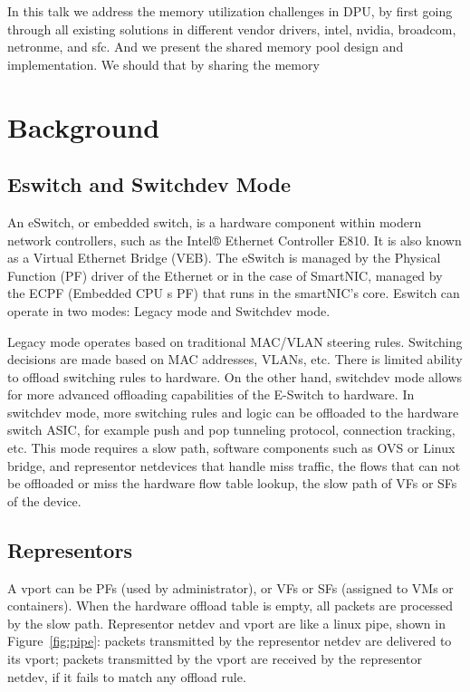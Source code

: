 \documentclass[letterpaper]{article}
\begin{document}
In this talk we address the memory utilization challenges in DPU, by
first going through all existing solutions in different vendor drivers,
intel, nvidia, broadcom, netronme, and sfc. And we present the shared
memory pool design and implementation.
We should that by sharing the memory 
\fi

\section{Background}

\subsection{Eswitch and Switchdev Mode}
An eSwitch, or embedded switch, is a hardware component within modern network
controllers, such as the Intel® Ethernet Controller E810. It is also known as
a Virtual Ethernet Bridge (VEB). The eSwitch is managed by the Physical Function (PF)
driver of the Ethernet or in the case of SmartNIC, managed by the ECPF (Embedded CPU
s PF) that runs in the smartNIC's core. Eswitch can operate in two modes:
Legacy mode and Switchdev mode.

Legacy mode operates based on traditional MAC/VLAN steering rules. Switching
decisions are made based on MAC addresses, VLANs, etc. There is limited ability
to offload switching rules to hardware.
On the other hand, switchdev mode allows for more advanced offloading
capabilities of the E-Switch to hardware. In switchdev mode, more switching
rules and logic can be offloaded to the hardware switch ASIC, for example
push and pop tunneling protocol, connection tracking, etc.
This mode requires a slow path, software components such as OVS or
Linux bridge, and representor netdevices that handle miss traffic,
the flows that can not be offloaded or miss the hardware flow table
lookup, the slow path of VFs or SFs of the device.

\subsection{Representors}

A vport can be PFs (used by administrator), or VFs or SFs (assigned to VMs
or containers). When the hardware offload table is empty, all packets are 
processed by the slow path. Representor netdev and vport are like a linux
pipe, shown in Figure~\ref{fig:pipe}: packets transmitted by the representor
netdev are delivered to its vport; packets transmitted by the vport are
received by the representor netdev, if it fails to match any offload rule.
\end{document}

